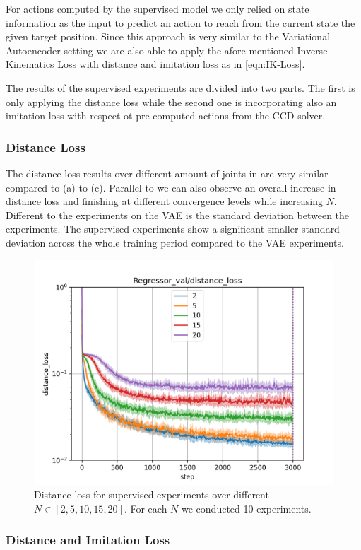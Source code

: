 For actions computed by the supervised model we only relied on state information as the input to predict an action to reach from the current state the given target position.  Since this approach is very similar to the Variational Autoencoder setting we are also able to apply the afore mentioned Inverse Kinematics Loss with distance and imitation loss as in \eqref{eqn:IK-Loss}.

The results of the supervised experiments are divided into two parts. The first is only applying the distance loss while the second one is incorporating also an imitation loss with respect ot pre computed actions from the CCD solver.

\subsubsection{Distance Loss}

The distance loss results over different amount of joints in  are very similar compared to  (a) to (c). Parallel to  we can also observe an overall increase in distance loss and finishing at different convergence levels while increasing $N$. Different to the experiments on the VAE is the standard deviation between the experiments. The supervised experiments show a significant smaller standard deviation across the whole training period compared to the VAE experiments.

\begin{figure}[h]
    \begin{center}
        \includegraphics[width=0.46 \linewidth]{figures/experiments/supervised_2_distance_loss.png}
    \end{center}
    \caption[Supervised Distance Loss]{Distance loss for supervised experiments over different $N \in [2, 5, 10, 15, 20]$. For each $N$ we conducted 10 experiments. }
    \label{fig:supervised_distance}
\end{figure}

\subsubsection{Distance and Imitation Loss}

